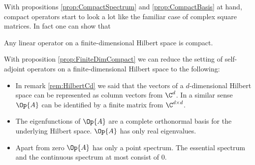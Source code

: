 With propositions \ref{prop:CompactSpectrum} and \ref{prop:CompactBasis}
at hand, compact operators start to look a lot like the familiar case
of complex square matrices.
In fact one can show that~\cite[p. 43]{Helffer2013}
\begin{prop}
	\label{prop:FiniteDimCompact}
	Any linear operator on a finite-dimensional Hilbert space is compact.
\end{prop}

\begin{rem}
With proposition \ref{prop:FiniteDimCompact}
we can reduce the setting of self-adjoint operators on a finite-dimensional
Hilbert space to the following:
\begin{itemize}
	\item In remark \vref{rem:HilbertCd} we said that the vectors
		of a $d$-dimensional Hilbert space
		can be represented as column vectors from $\C^d$.
		In a similar sense $\Op{A}$ can be identified by a finite matrix from
		$\C^{d \times d}$.
	\item The eigenfunctions of $\Op{A}$ are a complete orthonormal
		basis for the underlying Hilbert space.
		$\Op{A}$ has only real eigenvalues.
	\item Apart from zero $\Op{A}$ has only a point spectrum.
		The essential spectrum and the continuous spectrum at most consist of $0$.
\end{itemize}
\end{rem}

